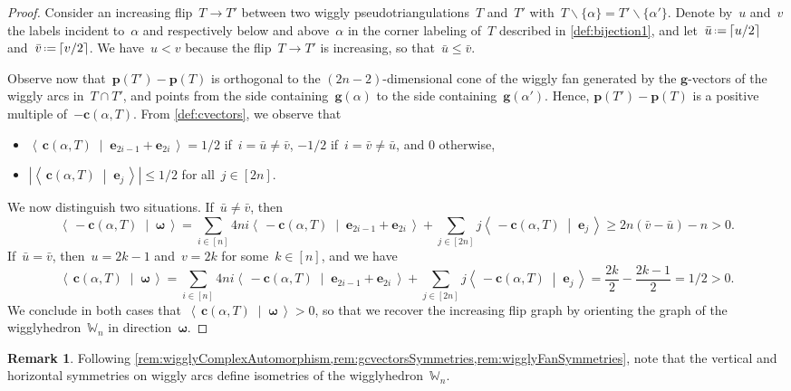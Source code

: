 \documentclass{amsart}
\theoremstyle{definition}
\newtheorem{remark}[theorem]{Remark}
\renewcommand{\b}[1]{{\boldsymbol{#1}}} %
\newcommand{\ssm}{\smallsetminus} %
\newcommand{\dotprod}[2]{\left\langle \, #1 \; \middle| \; #2 \, \right\rangle} %
\newcommand{\eqdef}{\mbox{\,\raisebox{0.2ex}{\scriptsize\ensuremath{\mathrm:}}\ensuremath{=}\,}} %
\newcommand{\polytope}[1]{\mathds{#1}} %
\newcommand{\wigglyhedron}{\polytope{W}} %
\begin{document}
\begin{proof}
Consider an increasing flip~$T \to T'$ between two wiggly pseudotriangulations~$T$ and~$T'$ with~$T \ssm \{\alpha\} = T' \ssm \{\alpha'\}$.
Denote by~$u$ and~$v$ the labels incident to~$\alpha$ and respectively below and above~$\alpha$ in the corner labeling of~$T$ described in \cref{def:bijection1}, and let~$\bar u \eqdef \lceil u/2 \rceil$ and~$\bar v \eqdef \lceil v/2 \rceil$.
We have~$u < v$ because the flip~$T \to T'$ is increasing, so that~$\bar u \le \bar v$.

Observe now that~${\b{p}(T') - \b{p}(T)}$ is orthogonal to the $(2n-2)$-dimensional cone of the wiggly fan generated by the $\b{g}$-vectors of the wiggly arcs in~$T \cap T'$, and points from the side containing~$\b{g}(\alpha)$ to the side containing~$\b{g}(\alpha')$.
Hence, $\b{p}(T') - \b{p}(T)$ is a positive multiple of~$-\b{c}(\alpha, T)$.
From \cref{def:cvectors}, we observe that
\begin{itemize}
\item $\dotprod{\b{c}(\alpha, T)}{\b{e}_{2i-1} + \b{e}_{2i}} = 1/2$ if~$i = \bar u \ne \bar v$, $-1/2$ if~$i = \bar v \ne \bar u$, and $0$ otherwise,
\item $|\dotprod{\b{c}(\alpha, T)}{\b{e}_j}| \le 1/2$ for all~$j \in [2n]$.
\end{itemize}
We now distinguish two situations.
If~$\bar u \ne \bar v$, then
\[
\dotprod{-\b{c}(\alpha, T)}{\b{\omega}} = \sum_{i \in [n]} 4ni \dotprod{-\b{c}(\alpha, T)}{\b{e}_{2i-1} + \b{e}_{2i}} + \sum_{j \in [2n]} j \dotprod{-\b{c}(\alpha, T)}{\b{e}_j} \ge 2n(\bar v - \bar u) - n > 0.
\]
If~$\bar u = \bar v$, then~$u = 2k-1$ and~$v = 2k$ for some~$k \in [n]$, and we have
\[
\dotprod{\b{c}(\alpha, T)}{\b{\omega}} = \!\! \sum_{i \in [n]} 4ni \dotprod{-\b{c}(\alpha, T)}{\b{e}_{2i-1} + \b{e}_{2i}} + \!\! \sum_{j \in [2n]} j \dotprod{-\b{c}(\alpha, T)}{\b{e}_j} = \frac{2k}{2}-\frac{2k-1}{2} = 1/2 > 0.
\]
We conclude in both cases that~$\dotprod{\b{c}(\alpha, T)}{\b{\omega}} > 0$, so that we recover the increasing flip graph by orienting the graph of the wigglyhedron~$\wigglyhedron_n$ in direction~$\b{\omega}$.
\end{proof}

\begin{remark}
\label{rem:wigglyhedronSymmetries}
Following \cref{rem:wigglyComplexAutomorphism,rem:gcvectorsSymmetries,rem:wigglyFanSymmetries}, note that the vertical and horizontal symmetries on wiggly arcs define isometries of the wigglyhedron~$\wigglyhedron_n$.
\end{remark}
\end{document}

